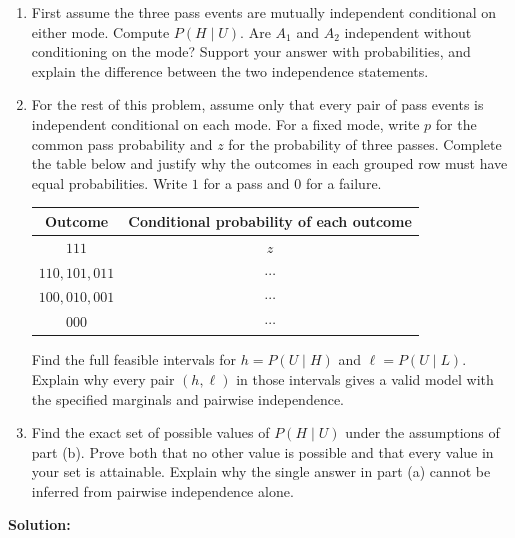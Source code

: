 \documentclass[11pt,a4paper]{article}
\newcommand{\Prob}{P}
\begin{document}
\begin{enumerate}
\item
First assume the three pass events are mutually independent
conditional on either mode. Compute $\Prob(H\mid U)$.
Are $A_1$ and $A_2$ independent without conditioning on the mode?
Support your answer with probabilities, and explain the difference
between the two independence statements.

\item
For the rest of this problem, assume only that every pair of
pass events is independent conditional on each mode.
For a fixed mode, write $p$ for the common pass probability
and $z$ for the probability of three passes.
Complete the table below and justify why the outcomes in each
grouped row must have equal probabilities.
Write $1$ for a pass and $0$ for a failure.

\begin{center}
\begin{tabular}{cc}
\toprule
Outcome & Conditional probability of each outcome\\
\midrule
$111$ & $z$\\
$110,101,011$ & $\cdots$\\
$100,010,001$ & $\cdots$\\
$000$ & $\cdots$\\
\bottomrule
\end{tabular}
\end{center}

Find the full feasible intervals for
$h=\Prob(U\mid H)$ and $\ell=\Prob(U\mid L)$.
Explain why every pair $(h,\ell)$ in those intervals gives
a valid model with the specified marginals and pairwise
independence.

\item
Find the exact set of possible values of $\Prob(H\mid U)$
under the assumptions of part (b).
Prove both that no other value is possible and that every
value in your set is attainable.
Explain why the single answer in part (a) cannot be inferred
from pairwise independence alone.
\end{enumerate}

\noindent\textbf{Solution:}
\end{document}
